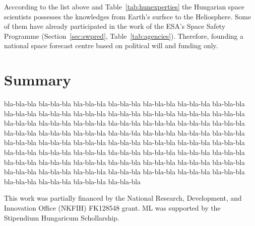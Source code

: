 \documentclass[sn-aps]{sn-jnl}%
\begin{document}
Acccording to the list above and Table~\ref{tab:hunexperties} the Hungarian space scientists possesses the knowledges from Earth's surfsce to the Heliosphere. Some of them have already participated in the work of the ESA's Space Safety Programme (Section~\ref{sec:swpred}, Table~\ref{tab:agencies}). Therefore, founding a national space forecast centre based on political will and funding only. 

\section{Summary}
\label{sec:sum}




bla-bla-bla bla-bla-bla bla-bla-bla bla-bla-bla bla-bla-bla bla-bla-bla bla-bla-bla bla-bla-bla bla-bla-bla bla-bla-bla bla-bla-bla bla-bla-bla bla-bla-bla bla-bla-bla bla-bla-bla bla-bla-bla bla-bla-bla bla-bla-bla bla-bla-bla bla-bla-bla bla-bla-bla bla-bla-bla bla-bla-bla bla-bla-bla bla-bla-bla bla-bla-bla bla-bla-bla bla-bla-bla bla-bla-bla bla-bla-bla bla-bla-bla bla-bla-bla bla-bla-bla bla-bla-bla bla-bla-bla bla-bla-bla bla-bla-bla bla-bla-bla bla-bla-bla bla-bla-bla bla-bla-bla bla-bla-bla bla-bla-bla bla-bla-bla bla-bla-bla bla-bla-bla bla-bla-bla bla-bla-bla bla-bla-bla bla-bla-bla bla-bla-bla bla-bla-bla bla-bla-bla bla-bla-bla bla-bla-bla bla-bla-bla bla-bla-bla bla-bla-bla bla-bla-bla bla-bla-bla





\backmatter


This work was partially financed by the National Research, Development, and Innovation Office (NKFIH) FK128548 grant. ML was supported by the Stipendium Hungaricum Schollarship. 

\vfill


\pagebreak

%



\pagebreak
\end{document}

